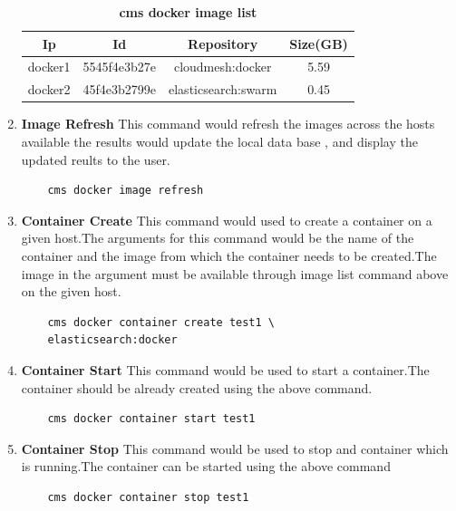 \documentclass[9pt,twocolumn,twoside]{../../styles/osajnl}
\begin{document}
\begin{enumerate}
    \begin{table}[h!]
     \caption{\bf cms docker image list }
     \begin{tabular}{cccc}
     \hline
      Ip & Id & Repository & Size(GB)\\
      \hline
      docker1 & 5545f4e3b27e & cloudmesh:docker & 5.59 \\
      docker2 & 45f4e3b2799e & elasticsearch:swarm & 0.45 \\
     \hline
     \end{tabular}
     \label{tab:shape-functions}
     \end{table}
     
    \item \textbf{Image Refresh} 
     This command would refresh the images across the hosts available the results would update the local data base , and display the updated reults to the user.
    \begin{verbatim}
    cms docker image refresh
    \end{verbatim}

    \item \textbf{Container Create}
     This command would used to create a container on a given host.The arguments for this command would be the name of the container and the image from which the container needs to be created.The image in the argument must be available through image list command above on the given host.\\
 
    \begin{verbatim}
    cms docker container create test1 \
    elasticsearch:docker
    \end{verbatim}
    
    \item \textbf{Container Start}
     This command would be used to start a container.The container should be already created using the above command.\\

    \begin{verbatim}
    cms docker container start test1
    \end{verbatim}     
     
    \item \textbf{Container Stop}
     This command would be used to stop and container which is running.The container can be started using the above command\\

    \begin{verbatim}
    cms docker container stop test1
    \end{verbatim}  
    

\end{enumerate}
\end{document}
